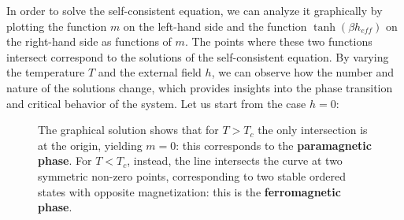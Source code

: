 In order to solve the self-consistent equation, we can analyze it graphically by plotting the function \(m\) on the left-hand side and the function \(\tanh\left( \beta h_{eff} \right)\) on the right-hand side as functions of \(m\). The points where these two functions intersect correspond to the solutions of the self-consistent equation. By varying the temperature \(T\) and the external field \(h\), we can observe how the number and nature of the solutions change, which provides insights into the phase transition and critical behavior of the system. Let us start from the case \(h=0\):
\begin{figure}[H]
    \begin{minipage}{0.6\textwidth}
        \centering
    \end{minipage}
    \hfill
    \begin{minipage}{0.35\textwidth}
        The graphical solution shows that for \(T > T_c\) the only intersection is at the origin, yielding \(m=0\): this corresponds to the \textbf{paramagnetic phase}. For \(T < T_c\), instead, the line intersects the curve at two symmetric non-zero points, corresponding to two stable ordered states with opposite magnetization: this is the \textbf{ferromagnetic phase}.
    \end{minipage}
\end{figure}
